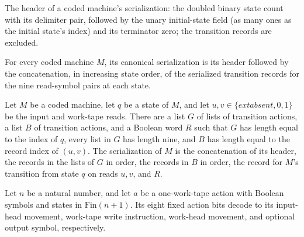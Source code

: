 \begin{definition}
\label{Turing.timedCut_Header}
\leanok
{}
The header of a coded machine's serialization: the doubled binary state count
with its delimiter pair, followed by the unary initial-state field (as many
ones as the initial state's index) and its terminator zero; the transition
records are excluded.
\end{definition}

\begin{lemma}
\label{Turing.timedCut_serialization_actions}
\leanok
{}
For every coded machine $M$, its canonical serialization is its header followed by the
concatenation, in increasing state order, of the serialized transition records for the
nine read-symbol pairs at each state.
\end{lemma}

\begin{lemma}
\label{Turing.timedCut_lookup_parts}
\leanok
{}
Let $M$ be a coded machine, let $q$ be a state of $M$, and let
$u,v\in\{	ext{absent},0,1\}$ be the input and work-tape reads. There are a list $G$ of
lists of transition actions, a list $B$ of transition actions, and a Boolean word $R$
such that $G$ has length equal to the index of $q$, every list in $G$ has length nine,
and $B$ has length equal to the record index of $(u,v)$. The serialization of $M$ is the
concatenation of its header, the records in the lists of $G$ in order, the records in
$B$ in order, the record for $M$'s transition from state $q$ on reads $u,v$, and $R$.
\end{lemma}

\begin{lemma}
\label{Turing.timedCut_ActionBits_decode}
\leanok
{}
Let $n$ be a natural number, and let $a$ be a one-work-tape action with Boolean symbols
and states in $\mathrm{Fin}(n+1)$. Its eight fixed action bits decode to its input-head
movement, work-tape write instruction, work-head movement, and optional output symbol,
respectively.
\end{lemma}

